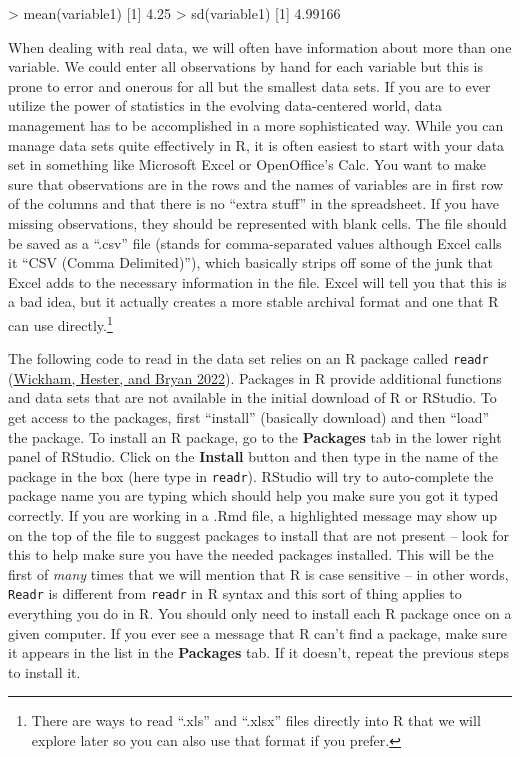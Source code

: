 \documentclass[
]{book}
\newenvironment{Shaded}{\begin{snugshade}}{\end{snugshade}}
\newcommand{\DecValTok}[1]{\textcolor[rgb]{0.00,0.00,0.81}{#1}}
\newcommand{\FloatTok}[1]{\textcolor[rgb]{0.00,0.00,0.81}{#1}}
\newcommand{\FunctionTok}[1]{\textcolor[rgb]{0.00,0.00,0.00}{#1}}
\newcommand{\NormalTok}[1]{#1}
\newcommand{\SpecialCharTok}[1]{\textcolor[rgb]{0.00,0.00,0.00}{#1}}
\begin{document}
\begin{Shaded}
\begin{Highlighting}[]
\SpecialCharTok{\textgreater{}} \FunctionTok{mean}\NormalTok{(variable1)}
\NormalTok{[}\DecValTok{1}\NormalTok{] }\FloatTok{4.25}
\SpecialCharTok{\textgreater{}} \FunctionTok{sd}\NormalTok{(variable1)}
\NormalTok{[}\DecValTok{1}\NormalTok{] }\FloatTok{4.99166}
\end{Highlighting}
\end{Shaded}

\indent When dealing with real data, we will often have information about more than one
variable. We could enter all observations by hand for each variable but this is
prone to error and onerous for all but the smallest data sets. If you are to
ever utilize the power of statistics in the evolving data-centered world, data
management has to be accomplished in a more sophisticated way. While you can
manage data sets quite effectively in R, it is often easiest to start with your
data set in something like Microsoft Excel or OpenOffice's Calc. You want to
make sure that observations are in the rows and the names of variables are in
first row of the columns and that there is no ``extra stuff'' in the spreadsheet. If you have
missing observations, they should be represented with blank cells. The file should
be saved as a ``.csv'' file (stands for comma-separated values although Excel
calls it ``CSV (Comma Delimited)''), which basically strips off some of the junk
that Excel adds to the necessary information in the file. Excel will tell you that
this is a bad idea, but it actually creates a more stable archival format and
one that R can use directly.\footnote{There are ways to read ``.xls'' and ``.xlsx'' files
  directly into R that we will explore later so you can also use that format if you prefer.}

\indent The following code to read in the data set relies on an R package called
\texttt{readr} (\protect\hyperlink{ref-R-readr}{Wickham, Hester, and Bryan 2022}). Packages in R provide additional functions and data sets that
are not available in the initial download of R or RStudio. To get access to the packages,
first ``install'' (basically
download) and then ``load'' the package. To install an R package, go to the \textbf{Packages}
tab in the lower right panel of
RStudio. Click on the \textbf{Install} button and then type in the name of the package in
the box (here type in \texttt{readr}).
RStudio will try to auto-complete the package name
you are typing which should help you make sure you got it typed correctly. If you are working in a .Rmd file, a highlighted message may show up on the top of the file to suggest packages to install that are not present -- look for this to help make sure you have the needed packages installed. This will
be the first of \emph{many} times that we will mention that R is case sensitive -- in
other words, \texttt{Readr} is different from \texttt{readr} in R syntax and this sort of
thing applies to everything you do in R. You should only need to install each R
package once on a given computer. If you ever see a message that R can't find a
package, make sure it appears in the list in the \textbf{Packages} tab. If it
doesn't, repeat the previous steps to install it.
\end{document}
